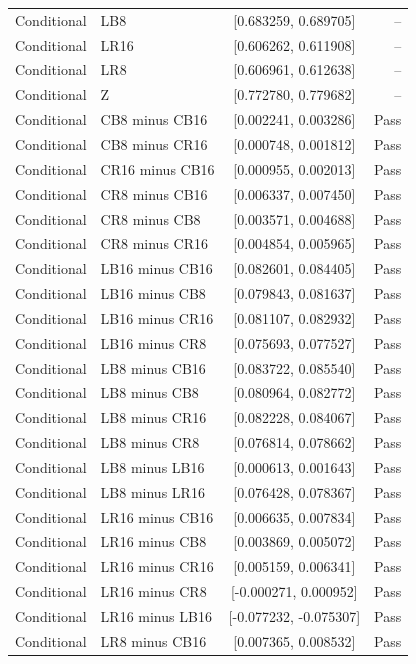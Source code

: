 {\begin{longtable}{llcr}
Conditional & LB8 & [0.683259, 0.689705] & -- \\
Conditional & LR16 & [0.606262, 0.611908] & -- \\
Conditional & LR8 & [0.606961, 0.612638] & -- \\
Conditional & Z & [0.772780, 0.779682] & -- \\
Conditional & CB8 minus CB16 & [0.002241, 0.003286] & Pass \\
Conditional & CB8 minus CR16 & [0.000748, 0.001812] & Pass \\
Conditional & CR16 minus CB16 & [0.000955, 0.002013] & Pass \\
Conditional & CR8 minus CB16 & [0.006337, 0.007450] & Pass \\
Conditional & CR8 minus CB8 & [0.003571, 0.004688] & Pass \\
Conditional & CR8 minus CR16 & [0.004854, 0.005965] & Pass \\
Conditional & LB16 minus CB16 & [0.082601, 0.084405] & Pass \\
Conditional & LB16 minus CB8 & [0.079843, 0.081637] & Pass \\
Conditional & LB16 minus CR16 & [0.081107, 0.082932] & Pass \\
Conditional & LB16 minus CR8 & [0.075693, 0.077527] & Pass \\
Conditional & LB8 minus CB16 & [0.083722, 0.085540] & Pass \\
Conditional & LB8 minus CB8 & [0.080964, 0.082772] & Pass \\
Conditional & LB8 minus CR16 & [0.082228, 0.084067] & Pass \\
Conditional & LB8 minus CR8 & [0.076814, 0.078662] & Pass \\
Conditional & LB8 minus LB16 & [0.000613, 0.001643] & Pass \\
Conditional & LB8 minus LR16 & [0.076428, 0.078367] & Pass \\
Conditional & LR16 minus CB16 & [0.006635, 0.007834] & Pass \\
Conditional & LR16 minus CB8 & [0.003869, 0.005072] & Pass \\
Conditional & LR16 minus CR16 & [0.005159, 0.006341] & Pass \\
Conditional & LR16 minus CR8 & [-0.000271, 0.000952] & Pass \\
Conditional & LR16 minus LB16 & [-0.077232, -0.075307] & Pass \\
Conditional & LR8 minus CB16 & [0.007365, 0.008532] & Pass \\

\end{longtable}}
